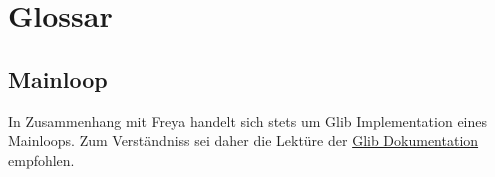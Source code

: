 \section{Glossar}
\subsection{Mainloop}
In Zusammenhang mit Freya handelt sich stets um Glib Implementation eines Mainloops.
Zum Verständniss sei daher die Lektüre der \href{http://developer.gnome.org/glib/2.30/glib-The-Main-Event-Loop.html#glib-The-Main-Event-Loop.description}{Glib Dokumentation} empfohlen.